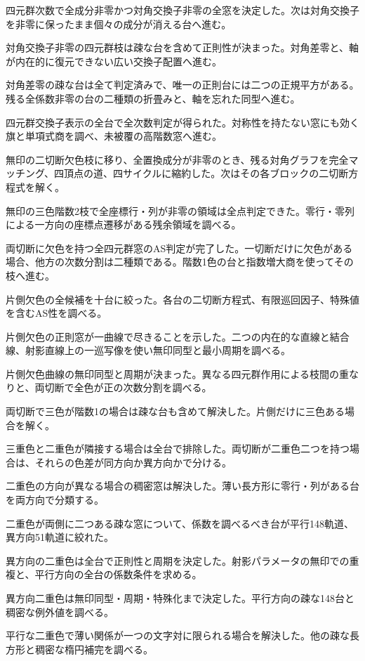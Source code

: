 \documentclass[11pt,a4paper]{ltjsarticle}
\begin{document}
四元群次数で全成分非零かつ対角交換子非零の全窓を決定した。次は対角交換子を非零に保ったまま個々の成分が消える台へ進む。

対角交換子非零の四元群枝は疎な台を含めて正則性が決まった。対角差零と、軸が内在的に復元できない広い交換子配置へ進む。

対角差零の疎な台は全て判定済みで、唯一の正則台には二つの正規平方がある。残る全係数非零の台の二種類の折畳みと、軸を忘れた同型へ進む。

四元群交換子表示の全台で全次数判定が得られた。対称性を持たない窓にも効く旗と単項式商を調べ、未被覆の高階数窓へ進む。

無印の二切断欠色枝に移り、全置換成分が非零のとき、残る対角グラフを完全マッチング、四頂点の道、四サイクルに縮約した。次はその各ブロックの二切断方程式を解く。

無印の三色階数2枝で全座標行・列が非零の領域は全点判定できた。零行・零列による一方向の座標点遷移がある残余領域を調べる。

両切断に欠色を持つ全四元群窓のAS判定が完了した。一切断だけに欠色がある場合、他方の次数分割は二種類である。階数1色の台と指数増大商を使ってその枝へ進む。

片側欠色の全候補を十台に絞った。各台の二切断方程式、有限巡回因子、特殊値を含むAS性を調べる。

片側欠色の正則窓が一曲線で尽きることを示した。二つの内在的な直線と結合線、射影直線上の一巡写像を使い無印同型と最小周期を調べる。

片側欠色曲線の無印同型と周期が決まった。異なる四元群作用による枝間の重なりと、両切断で全色が正の次数分割を調べる。

両切断で三色が階数1の場合は疎な台も含めて解決した。片側だけに三色ある場合を解く。

三重色と二重色が隣接する場合は全台で排除した。両切断が二重色二つを持つ場合は、それらの色差が同方向か異方向かで分ける。

二重色の方向が異なる場合の稠密窓は解決した。薄い長方形に零行・列がある台を両方向で分類する。

二重色が両側に二つある疎な窓について、係数を調べるべき台が平行148軌道、異方向51軌道に絞れた。

異方向の二重色は全台で正則性と周期を決定した。射影パラメータの無印での重複と、平行方向の全台の係数条件を求める。

異方向二重色は無印同型・周期・特殊化まで決定した。平行方向の疎な148台と稠密な例外値を調べる。

平行な二重色で薄い関係が一つの文字対に限られる場合を解決した。他の疎な長方形と稠密な楕円補完を調べる。
\end{document}
